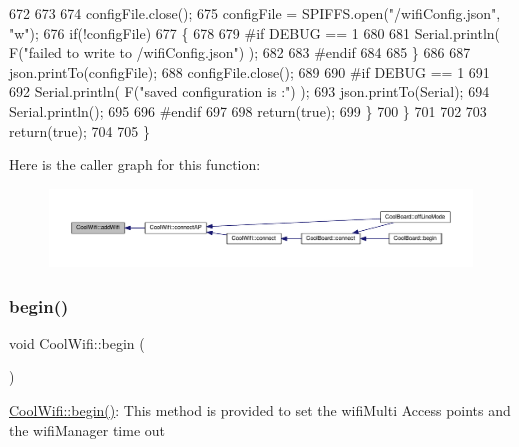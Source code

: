 \begin{DoxyCode}
672             
673 
674             configFile.close();
675             configFile = SPIFFS.open(\textcolor{stringliteral}{"/wifiConfig.json"}, \textcolor{stringliteral}{"w"});
676             \textcolor{keywordflow}{if}(!configFile)
677             \{
678             
679 \textcolor{preprocessor}{            #if DEBUG == 1 }
680 
681                 Serial.println( F(\textcolor{stringliteral}{"failed to write to /wifiConfig.json"}) );
682             
683 \textcolor{preprocessor}{            #endif}
684 
685             \}
686             
687             json.printTo(configFile);
688             configFile.close();
689 
690 \textcolor{preprocessor}{        #if DEBUG == 1 }
691 
692             Serial.println( F(\textcolor{stringliteral}{"saved configuration is :"}) );
693             json.printTo(Serial);
694             Serial.println();
695         
696 \textcolor{preprocessor}{        #endif}
697 
698             \textcolor{keywordflow}{return}(\textcolor{keyword}{true}); 
699         \}
700     \}   
701 
702     
703     \textcolor{keywordflow}{return}(\textcolor{keyword}{true});
704     
705 \}
\end{DoxyCode}
Here is the caller graph for this function\+:\nopagebreak
\begin{figure}[H]
\begin{center}
\leavevmode
\includegraphics[width=350pt]{d7/d29/class_cool_wifi_a914d7a1df14dd6b75345fb614c34e9d6_icgraph}
\end{center}
\end{figure}
\mbox{\label{class_cool_wifi_a46942fed90e475112cc10b78a32e7aaa}} 
\subsubsection{\texorpdfstring{begin()}{begin()}}
{\footnotesize\ttfamily void Cool\+Wifi\+::begin (\begin{DoxyParamCaption}{ }\end{DoxyParamCaption})}

\hyperlink{class_cool_wifi_a46942fed90e475112cc10b78a32e7aaa}{Cool\+Wifi\+::begin()}\+: This method is provided to set the wifi\+Multi Access points and the wifi\+Manager time out 

